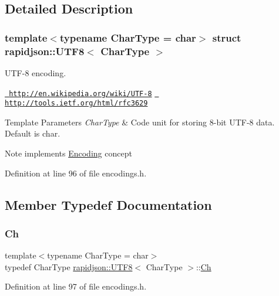 \subsection{Detailed Description}
\subsubsection*{template$<$typename Char\+Type = char$>$\newline
struct rapidjson\+::\+U\+T\+F8$<$ Char\+Type $>$}

U\+T\+F-\/8 encoding. 

\href{http://en.wikipedia.org/wiki/UTF-8}{\texttt{ http\+://en.\+wikipedia.\+org/wiki/\+U\+T\+F-\/8}} \href{http://tools.ietf.org/html/rfc3629}{\texttt{ http\+://tools.\+ietf.\+org/html/rfc3629}} 
\begin{DoxyTemplParams}{Template Parameters}
{\em Char\+Type} & Code unit for storing 8-\/bit U\+T\+F-\/8 data. Default is char. \\
\hline
\end{DoxyTemplParams}
\begin{DoxyNote}{Note}
implements \mbox{\hyperlink{classrapidjson_1_1_encoding}{Encoding}} concept 
\end{DoxyNote}


Definition at line 96 of file encodings.\+h.



\subsection{Member Typedef Documentation}
\mbox{\label{structrapidjson_1_1_u_t_f8_a9f47e775d8306a647a5c9eceac4b52fc}} 
\subsubsection{\texorpdfstring{Ch}{Ch}}
{\footnotesize\ttfamily template$<$typename Char\+Type  = char$>$ \\
typedef Char\+Type \mbox{\hyperlink{structrapidjson_1_1_u_t_f8}{rapidjson\+::\+U\+T\+F8}}$<$ Char\+Type $>$\+::\mbox{\hyperlink{structrapidjson_1_1_u_t_f8_a9f47e775d8306a647a5c9eceac4b52fc}{Ch}}}



Definition at line 97 of file encodings.\+h.



